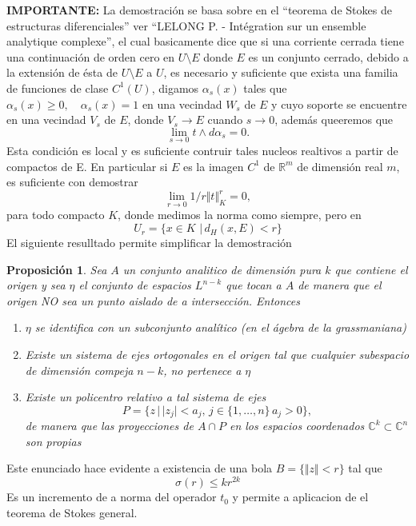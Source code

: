 \documentclass[letterpaper]{article}
\newtheorem{prop}[teorema]{Proposici\'on}
\newcommand{\co}{\ensuremath{\mathbb C }}
\newcommand{\con}{\ensuremath{\mathbb{C}^n}}
\newcommand{\re}{\ensuremath{\mathbb R }}
\begin{document}
\noindent \textbf{IMPORTANTE:} La demostración se basa sobre en el ``teorema de Stokes de estructuras diferenciales'' ver ``LELONG P. - Intégration sur un ensemble analytique complexe'', el cual basicamente dice que si una corriente cerrada tiene una continuación de orden cero en \(U\setminus E\) donde \(E\) es un conjunto cerrado, debido a la extensión de ésta de \(U\setminus E\) a \(U\), es necesario y suficiente que exista una familia de funciones de clase \(C^{1}(U)\), digamos \(\alpha_s(x)\) tales que \(\alpha_s(x)\geq0,\quad\alpha_s(x)=1\) en una vecindad \(W_s\) de \(E\) y cuyo soporte se encuentre en una vecindad \(V_s\) de \(E\), donde \(V_s\rightarrow E\) cuando \(s\rightarrow 0\), además queeremos que
\[
    \lim_{s\rightarrow 0}t\wedge d\alpha_s=0.
\]
Esta condición es local y es suficiente contruir tales nucleos realtivos a partir de compactos de E. En particular si \(E\) es la imagen \(C^1\) de \(\re^m\) de dimensión real \(m\), es suficiente con demostrar
\[
    \lim_{r\rightarrow 0}1/r\Vert t\Vert^{r}_K=0,
\]
para todo compacto \(K\), donde medimos la norma como siempre, pero en
\[
 U_r=\{x\in K\,\,\vert\,d_H(x,E)<r\}
\]
El siguiente resulltado permite simplificar la demostración
\begin{prop}
Sea $A$ un conjunto analitico de dimensión pura $k$ que contiene el origen y sea \(\eta\) el conjunto de espacios \(L^{n-k}\) que tocan a $A$ de manera que el origen NO sea un punto aislado de a intersección. Entonces
\begin{enumerate}
\item \(\eta\) se identifica con un subconjunto analítico (en el ágebra de la grassmaniana)

\item Existe un sistema de ejes ortogonales en el origen tal que cualquier subespacio de dimensión compeja \(n-k\), no pertenece a \(\eta\)

\item Existe un policentro relativo a tal sistema de ejes
\[
    P=\{z\,|\,|z_j|<a_j,\,j\in\{1,\dots,n\}\,a_j>0\},
\]
de manera que las proyecciones de $A\cap P$ en los espacios coordenados $\co^{k}\subset\con$ son propias
\end{enumerate}
\end{prop}
Este enunciado hace evidente a existencia de una bola \(B=\{\Vert z\Vert<r\}\) tal que
\[
        \sigma(r)\leq kr^{2k}
\]
Es un incremento de a norma del operador \(t_0\) y permite a aplicacion de el teorema de Stokes general.
\end{document}
